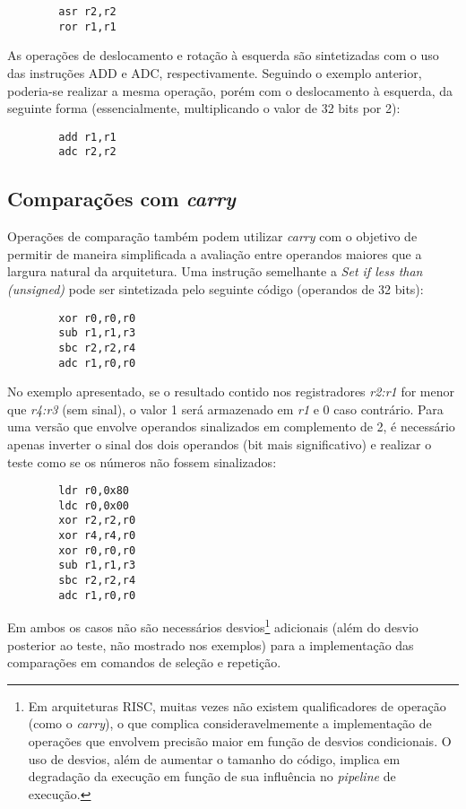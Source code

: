 \documentclass{extreport}
\begin{document}
\begin{verbatim}
        asr r2,r2
        ror r1,r1
\end{verbatim}

As operações de deslocamento e rotação à esquerda são sintetizadas com o uso das instruções ADD e ADC, respectivamente. Seguindo o exemplo anterior, poderia-se realizar a mesma operação, porém com o deslocamento à esquerda, da seguinte forma (essencialmente, multiplicando o valor de 32 bits por 2):

\begin{verbatim}
        add r1,r1
        adc r2,r2
\end{verbatim}

\subsection{Comparações com \textit{carry}}

Operações de comparação também podem utilizar \textit{carry} com o objetivo de permitir de maneira simplificada a avaliação entre operandos maiores que a largura natural da arquitetura. Uma instrução semelhante a \textit{Set if less than (unsigned)} pode ser sintetizada pelo seguinte código (operandos de 32 bits):

\begin{verbatim}
        xor r0,r0,r0
        sub r1,r1,r3
        sbc r2,r2,r4
        adc r1,r0,r0
\end{verbatim}

No exemplo apresentado, se o resultado contido nos registradores \textit{r2:r1} for menor que \textit{r4:r3} (sem sinal), o valor 1 será armazenado em \textit{r1} e 0 caso contrário. Para uma versão que envolve operandos sinalizados em complemento de 2, é necessário apenas inverter o sinal dos dois operandos (bit mais significativo) e realizar o teste como se os números não fossem sinalizados:

\begin{verbatim}
        ldr r0,0x80
        ldc r0,0x00
        xor r2,r2,r0
        xor r4,r4,r0
        xor r0,r0,r0
        sub r1,r1,r3
        sbc r2,r2,r4
        adc r1,r0,r0
\end{verbatim}

Em ambos os casos não são necessários desvios\footnote{Em arquiteturas RISC, muitas vezes não existem qualificadores de operação (como o \textit{carry}), o que complica consideravelmemente a implementação de operações que envolvem precisão maior em função de desvios condicionais. O uso de desvios, além de aumentar o tamanho do código, implica em degradação da execução em função de sua influência no \textit{pipeline} de execução.} adicionais (além do desvio posterior ao teste, não mostrado nos exemplos) para a implementação das comparações em comandos de seleção e repetição.
\end{document}
